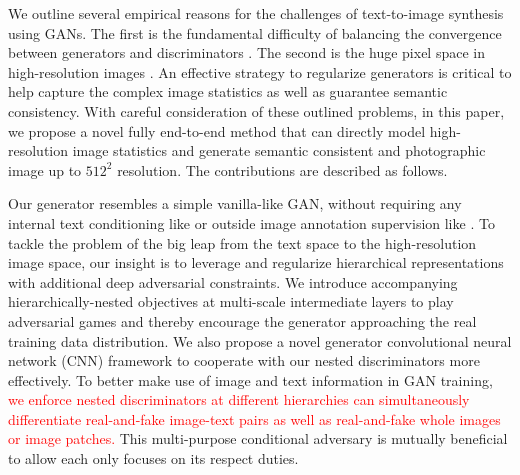 \documentclass[10pt,twocolumn,letterpaper]{article}
\begin{document}
We outline several empirical reasons for the challenges of text-to-image synthesis using GANs. The first is the fundamental difficulty of balancing the convergence between generators and discriminators \cite{goodfellow2014generative,improvedGAN}. %
The second is the huge pixel space in high-resolution images \cite{han2017stackgan}. 
An effective strategy to regularize generators is critical to help capture the complex image statistics \cite{huang2016stacked} as well as guarantee semantic consistency. 
With careful consideration of these outlined problems, in this paper, we propose a novel fully end-to-end method that can directly model high-resolution image statistics and generate semantic consistent and photographic image up to $512^2$ resolution. The contributions are described as follows.


Our generator resembles a simple vanilla-like GAN, without requiring any internal text conditioning like \cite{han2017stackgan} or outside image annotation supervision like \cite{dash2017tac}. To tackle the problem of the big leap from the text space to the high-resolution image space, our insight is to leverage and regularize hierarchical representations with additional deep adversarial constraints. 
We introduce accompanying hierarchically-nested objectives at multi-scale intermediate layers to play adversarial games and thereby encourage the generator approaching the real training data distribution. 
We also propose a novel generator convolutional neural network (CNN) framework to cooperate with our nested discriminators more effectively.
To better make use of image and text information in GAN training, 
\textcolor{red}{we enforce nested discriminators at different hierarchies can simultaneously differentiate real-and-fake image-text pairs as well as real-and-fake whole images or image patches.}
This multi-purpose conditional adversary is mutually beneficial to allow each only focuses on its respect duties. 
\end{document}
